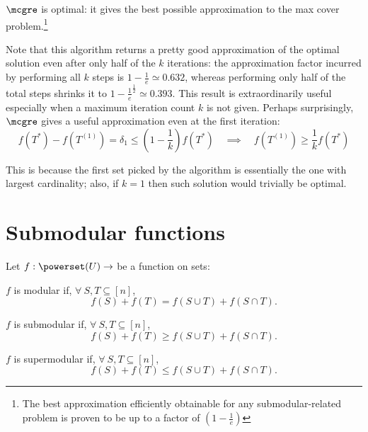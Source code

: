 \begin{corollary}
    $\mcgre$ is optimal: it gives the best possible approximation to the max cover problem.\footnote{The best approximation efficiently obtainable for any submodular-related problem is proven to be up to a factor of $\left( 1 - \frac{1}{e} \right)$}
\end{corollary}

Note that this algorithm returns a pretty good approximation of the optimal solution even after only half of the $k$ iterations: the approximation factor incurred by performing all $k$ steps is $1 - \frac{1}{e} \simeq 0.632$, whereas performing only half of the total steps shrinks it to $1 - \frac{1}{e}^{\frac{1}{2}} \simeq 0.393$. This result is extraordinarily useful especially when a maximum iteration count $k$ is not given. Perhaps surprisingly, $\mcgre$ gives a useful approximation even at the first iteration:
\[
    f(T^*) - f(T^{(1)}) = \delta_1 \leq \left( 1 - \frac{1}{k} \right) f(T^*) \quad \implies \quad f(T^{(1)}) \geq \frac{1}{k} f(T^*)
\]

This is because the first set picked by the algorithm is essentially the one with largest cardinality; also, if $k = 1$ then such solution would trivially be optimal.

\section{Submodular functions}

Let $f: \powerset(U) \to \real$ be a function on sets:

\begin{definition}\label{def:modular}
    $f$ is modular if, $\forall\ S, T \subseteq [n]$,
    \begin{equation}\label{eq:modular}
        f(S) + f(T) = f(S \cup T) + f(S \cap T).
    \end{equation}
\end{definition}

\begin{definition}\label{def:submodular}
    $f$ is submodular if, $\forall\ S, T \subseteq [n]$,
    \begin{equation}\label{eq:submodular}
        f(S) + f(T) \geq f(S \cup T) + f(S \cap T).
    \end{equation}
\end{definition}

\begin{definition}\label{def:supermodular}
    $f$ is supermodular if, $\forall\ S, T \subseteq [n]$,
    \begin{equation}\label{eq:supermodular}
        f(S) + f(T) \leq f(S \cup T) + f(S \cap T).
    \end{equation}
\end{definition}

